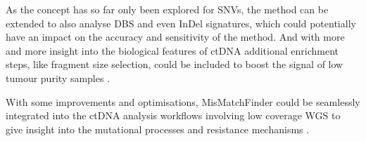 As the concept has so far only been explored for SNVs, the method can be extended to also analyse DBS and even InDel signatures, which could potentially have an impact on the accuracy and sensitivity of the method.
And with more and more insight into the biological features of ctDNA additional enrichment steps, like fragment size selection, could be included to boost the signal of low tumour purity samples \cite{Mouliere2018,Markus2022}.

With some improvements and optimisations, MisMatchFinder could be seamlessly integrated into the ctDNA analysis workflows involving low coverage WGS to give insight into the mutational processes and resistance mechanisms \cite{Homburger2019,Chen2021}.
